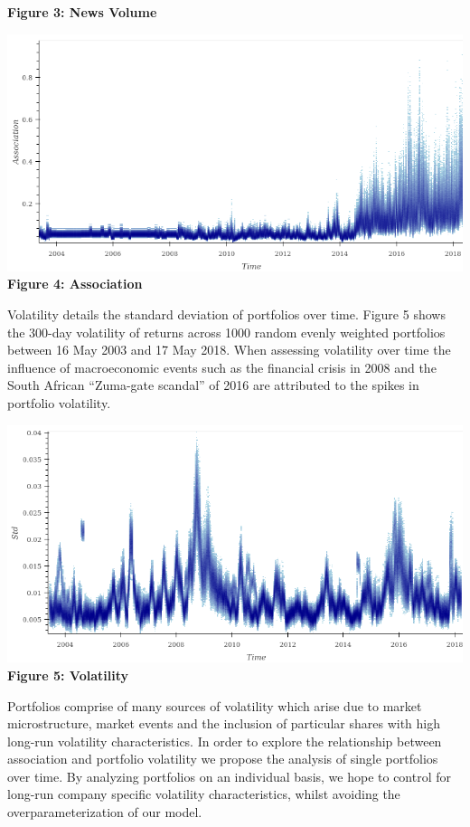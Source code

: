 \documentclass[11pt]{article}
\makeatletter
\def\maxwidth{\ifdim\Gin@nat@width>\linewidth\linewidth
    \else\Gin@nat@width\fi}
\let\Oldincludegraphics\includegraphics
\renewcommand{\includegraphics}[1]{\Oldincludegraphics[width=.8\maxwidth]{#1}}
\makeatother
\begin{document}
\textbf{Figure 3: News Volume}

\includegraphics{../experiments/media/Association Over Time.png}\\

\textbf{Figure 4: Association}

Volatility details the standard deviation of portfolios over time.
Figure 5 shows the 300-day volatility of returns across 1000 random
evenly weighted portfolios between 16 May 2003 and 17 May 2018. When
assessing volatility over time the influence of macroeconomic events
such as the financial crisis in 2008 and the South African ``Zuma-gate
scandal'' of 2016 are attributed to the spikes in portfolio volatility.

\includegraphics{../experiments/media/Volatility Over Time time.png}\\

\textbf{Figure 5: Volatility}

Portfolios comprise of many sources of volatility which arise due to
market microstructure, market events and the inclusion of particular
shares with high long-run volatility characteristics. In order to
explore the relationship between association and portfolio volatility we
propose the analysis of single portfolios over time. By analyzing
portfolios on an individual basis, we hope to control for long-run
company specific volatility characteristics, whilst avoiding the
overparameterization of our model.
\end{document}
